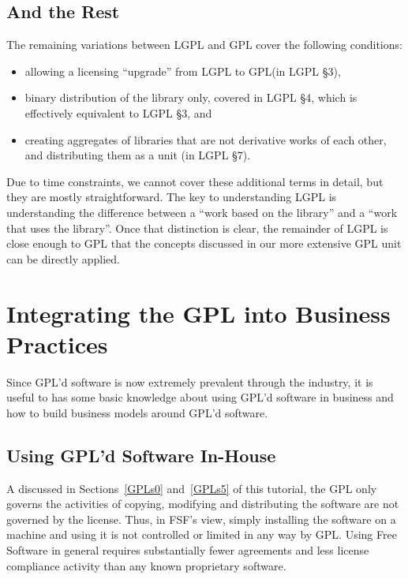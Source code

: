 \documentclass[12pt]{report}
\begin{document}
\section{And the Rest}

The remaining variations between LGPL and GPL cover the following
conditions:

\begin{itemize}

\item allowing a licensing ``upgrade'' from LGPL to GPL\@ (in LGPL \S 3),

\item binary distribution of the library only, covered in LGPL \S 4,
  which is effectively equivalent to LGPL \S 3, and

\item creating aggregates of libraries that are not derivative works of
  each other, and distributing them as a unit (in LGPL \S 7).
\end{itemize}


Due to time constraints, we cannot cover these additional terms in detail,
but they are mostly straightforward.  The key to understanding LGPL is
understanding the difference between a ``work based on the library'' and a
``work that uses the library''.  Once that distinction is clear, the
remainder of LGPL is close enough to GPL that the concepts discussed in
our more extensive GPL unit can be directly applied.

\chapter{Integrating the GPL into Business Practices}

Since GPL'd software is now extremely prevalent through the industry, it
is useful to has some basic knowledge about using GPL'd software in
business and how to build business models around GPL'd software.

\section{Using GPL'd Software In-House}

A discussed in Sections~\ref{GPLs0} and~\ref{GPLs5} of this tutorial, the
GPL only governs the activities of copying, modifying and distributing the
software are not governed by the license.  Thus, in FSF's view, simply
installing the software on a machine and using it is not controlled or
limited in any way by GPL\@.  Using Free Software in general requires
substantially fewer agreements and less license compliance activity than
any known proprietary software.
\end{document}
